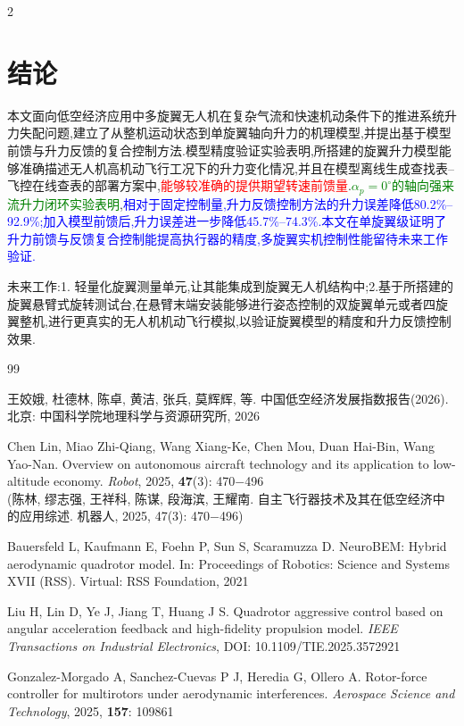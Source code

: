 \documentclass{aas}
\begin{document}
\begin{multicols}{2}
\section{结论}

本文面向低空经济应用中多旋翼无人机在复杂气流和快速机动条件下的推进系统升力失配问题,建立了从整机运动状态到单旋翼轴向升力的机理模型,并提出基于模型前馈与升力反馈的复合控制方法.模型精度验证实验表明,所搭建的旋翼升力模型能够准确描述无人机高机动飞行工况下的升力变化情况,并且在模型离线生成查找表--飞控在线查表的部署方案中,\textcolor{red}{能够较准确的提供期望转速前馈量}.\textcolor{green}{$\alpha_p=0^{\circ}$的轴向强来流升力闭环实验表明},\textcolor{blue}{相对于固定控制量,升力反馈控制方法的升力误差降低80.2\%--92.9\%;加入模型前馈后,升力误差进一步降低45.7\%--74.3\%.本文在单旋翼级证明了升力前馈与反馈复合控制能提高执行器的精度,多旋翼实机控制性能留待未来工作验证.}

未来工作:1. 轻量化旋翼测量单元,让其能集成到旋翼无人机结构中;2.基于所搭建的旋翼悬臂式旋转测试台,在悬臂末端安装能够进行姿态控制的双旋翼单元或者四旋翼整机,进行更真实的无人机机动飞行模拟,以验证旋翼模型的精度和升力反馈控制效果.

\begin{thebibliography}{99}
 \addtolength{\itemsep}{0.2em} 

 王姣娥, 杜德林, 陈卓, 黄洁, 张兵, 莫辉辉, 等. 中国低空经济发展指数报告(2026). 北京: 中国科学院地理科学与资源研究所, 2026

 Chen Lin, Miao Zhi-Qiang, Wang Xiang-Ke, Chen Mou, Duan Hai-Bin, Wang Yao-Nan. Overview on autonomous aircraft technology and its application to low-altitude economy. {\sl Robot}, 2025, {\bf 47}(3): 470$-$496 \\
(陈林, 缪志强, 王祥科, 陈谋, 段海滨, 王耀南. 自主飞行器技术及其在低空经济中的应用综述. 机器人, 2025, 47(3): 470$-$496)

 Bauersfeld L, Kaufmann E, Foehn P, Sun S, Scaramuzza D. NeuroBEM: Hybrid aerodynamic quadrotor model. In: Proceedings of Robotics: Science and Systems XVII (RSS). Virtual: RSS Foundation, 2021

 Liu H, Lin D, Ye J, Jiang T, Huang J S. Quadrotor aggressive control based on angular acceleration feedback and high-fidelity propulsion model. {\sl IEEE Transactions on Industrial Electronics}, DOI: 10.1109/TIE.2025.3572921

 Gonzalez-Morgado A, Sanchez-Cuevas P J, Heredia G, Ollero A. Rotor-force controller for multirotors under aerodynamic interferences. {\sl Aerospace Science and Technology}, 2025, {\bf 157}: 109861


\end{thebibliography}
\end{multicols}
\end{document}
